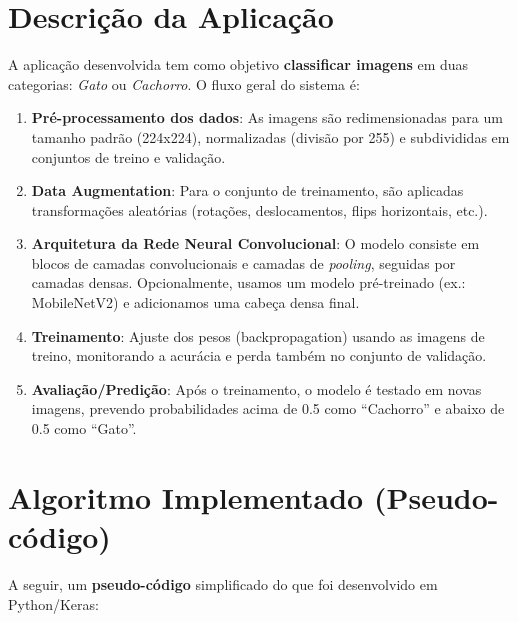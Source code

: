 \documentclass[a4paper,12pt]{article}
\begin{document}
\section{Descrição da Aplicação}
A aplicação desenvolvida tem como objetivo \textbf{classificar imagens} em duas categorias: \emph{Gato} ou \emph{Cachorro}. O fluxo geral do sistema é:
\begin{enumerate}
    \item \textbf{Pré-processamento dos dados}: As imagens são redimensionadas para um tamanho padrão (224x224), normalizadas (divisão por 255) e subdivididas em conjuntos de treino e validação.
    \item \textbf{Data Augmentation}: Para o conjunto de treinamento, são aplicadas transformações aleatórias (rotações, deslocamentos, flips horizontais, etc.).
    \item \textbf{Arquitetura da Rede Neural Convolucional}: O modelo consiste em blocos de camadas convolucionais e camadas de \textit{pooling}, seguidas por camadas densas. Opcionalmente, usamos um modelo pré-treinado (ex.: MobileNetV2) e adicionamos uma cabeça densa final.
    \item \textbf{Treinamento}: Ajuste dos pesos (backpropagation) usando as imagens de treino, monitorando a acurácia e perda também no conjunto de validação.
    \item \textbf{Avaliação/Predição}: Após o treinamento, o modelo é testado em novas imagens, prevendo probabilidades acima de 0.5 como “Cachorro” e abaixo de 0.5 como “Gato”.
\end{enumerate}

\section{Algoritmo Implementado (Pseudo-código)}

A seguir, um \textbf{pseudo-código} simplificado do que foi desenvolvido em Python/Keras:
\end{document}
